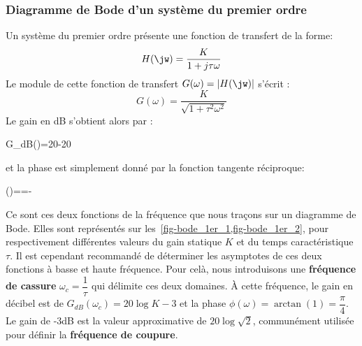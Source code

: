 \subsubsection{Diagramme de Bode d'un système du premier ordre}
Un système du premier ordre présente une fonction de transfert de la forme:
\begin{align}
H(\jw)=\dfrac{K}{1+j\tau\omega }\label{eq-1er_ftjw}
\end{align}
Le module de cette fonction de transfert $G(\omega) =|H(\jw)|$ s'écrit :
\[
    G(\omega)=\dfrac{K}{\sqrt{1+\tau^2\omega^2}}
\]
Le gain en dB s'obtient alors par :
\begin{bequation}
    G_{dB}(\omega)=20-20\label{eq-gain_1er}
\end{bequation}
et la phase est simplement donné par la fonction tangente réciproque:
\begin{bequation}
    \phi(\omega)==-\arctan{(\tau\omega)}\label{eq-phase_1er} 
\end{bequation}
Ce sont ces deux fonctions de la fréquence que nous traçons sur un diagramme
de Bode. Elles sont représentés sur les~\cref{fig-bode_1er_1,fig-bode_1er_2}, 
pour respectivement différentes valeurs du gain statique $K$ et du temps 
caractéristique $\tau$.
\newline
Il est cependant recommandé de déterminer les asymptotes 
de ces deux fonctions à basse et haute fréquence. 
Pour celà, nous introduisons une \textbf{fréquence de cassure} 
$\omega_c=\dfrac{1}{\tau}$ qui délimite ces deux domaines.
\`A cette fréquence, le gain en décibel est de $G_{dB}(\omega_c)=20\log{K}-3$ 
et la phase $\phi(\omega)=\arctan{(1)}=\dfrac{\pi}{4}$.
Le gain de -3dB est la valeur approximative de $20\log{\sqrt{2}}$, communément
utilisée pour définir la \textbf{fréquence de coupure}.

